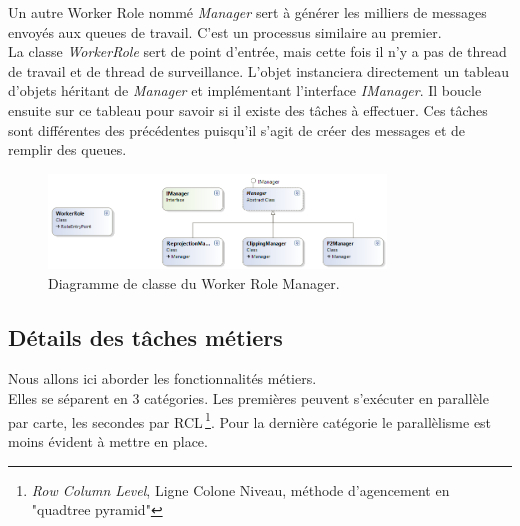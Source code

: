 Un autre Worker Role nommé \textit{Manager} sert à générer les
milliers de messages envoyés aux queues de travail. C'est un processus
similaire au premier. \\

La classe \textit{WorkerRole} sert de point d'entrée, mais cette fois
il n'y a pas de thread de travail et de thread de
surveillance. L'objet instanciera directement un tableau d'objets
héritant de \textit{Manager} et implémentant l'interface
\textit{IManager}. Il boucle ensuite sur ce tableau pour savoir si il
existe des tâches à effectuer. Ces tâches sont différentes des
précédentes puisqu'il s'agit de créer des messages et de remplir des
queues.

\begin{figure}[h!]
  \caption{Diagramme de classe du Worker Role Manager.}
  \centering
    \includegraphics[width=0.8\textwidth]{images/Manager.png}
\end{figure}









%
%

\subsection{Détails des tâches métiers}
Nous allons ici aborder les fonctionnalités métiers. \\ Elles se
séparent en 3 catégories. Les premières peuvent s'exécuter en
parallèle par carte, les secondes par RCL\,\footnote{\textit{Row
    Column Level}, Ligne Colone Niveau, méthode d'agencement en
  "quadtree pyramid"}. Pour la dernière catégorie le parallèlisme est
moins évident à mettre en place. \\


